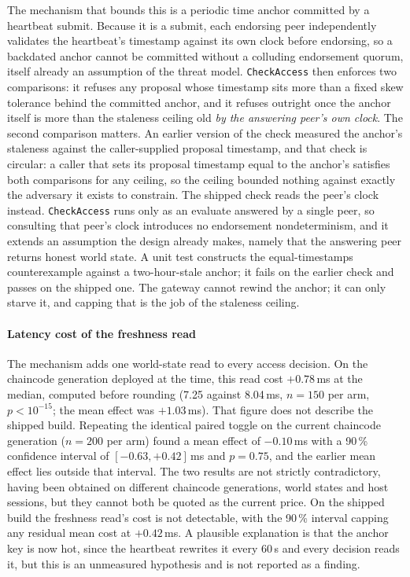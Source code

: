 \documentclass[preprint,12pt]{elsarticle}
\begin{document}
The mechanism that bounds this is a periodic time anchor committed by a
heartbeat submit. Because it is a submit, each endorsing peer independently
validates the heartbeat's timestamp against its own clock before endorsing, so a
backdated anchor cannot be committed without a colluding endorsement quorum,
itself already an assumption of the threat model. \texttt{CheckAccess} then
enforces two comparisons: it refuses any proposal whose timestamp sits more
than a fixed skew tolerance behind the committed anchor, and it refuses
outright once the anchor itself is more than the staleness ceiling old
\emph{by the answering peer's own clock}. The second comparison matters. An
earlier version of the check measured the anchor's staleness against the
caller-supplied proposal timestamp, and that check is circular: a caller that
sets its proposal timestamp equal to the anchor's satisfies both comparisons
for any ceiling, so the ceiling bounded nothing against exactly the adversary
it exists to constrain. The shipped check reads the peer's clock instead.
\texttt{CheckAccess} runs only as an evaluate answered by a single peer, so
consulting that peer's clock introduces no endorsement nondeterminism, and it
extends an assumption the design already makes, namely that the answering peer
returns honest world state. A unit test constructs the equal-timestamps
counterexample against a two-hour-stale anchor; it fails on the earlier check
and passes on the shipped one. The gateway cannot rewind the anchor; it can
only starve it, and capping that is the job of the staleness ceiling.

\paragraph{Latency cost of the freshness read}
The mechanism adds one world-state read to every access decision. On the
chaincode generation deployed at the time, this read cost $+0.78$\,ms at the
median, computed before rounding (7.25 against 8.04\,ms, $n=150$ per arm,
$p<10^{-15}$; the mean effect was $+1.03$\,ms). That figure
does not describe the shipped build. Repeating the identical paired toggle on
the current chaincode generation ($n=200$ per arm) found a mean effect of
$-0.10$\,ms with a 90\,\% confidence interval of $[-0.63, +0.42]$\,ms and
$p = 0.75$, and the earlier mean effect lies outside that interval. The two
results are not strictly contradictory, having been obtained on different
chaincode generations, world states and host sessions, but they cannot both be
quoted as the current price. On the shipped build the freshness read's cost is
not detectable, with the 90\,\% interval capping any residual mean cost at
$+0.42$\,ms. A
plausible explanation is that the anchor key is now hot, since the heartbeat
rewrites it every 60\,s and every decision reads it, but this is an unmeasured
hypothesis and is not reported as a finding.
\end{document}
